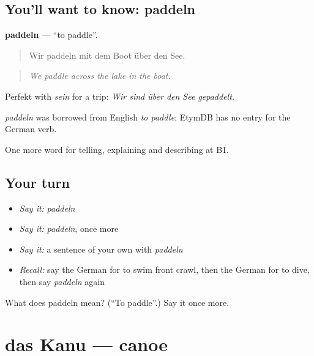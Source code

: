 \subsection*{You'll want to know: paddeln}
\textbf{paddeln} — \textquotedblleft{}to paddle\textquotedblright{}.

\begin{quote}
Wir paddeln mit dem Boot über den See.
\end{quote}

\begin{quote}
\emph{We paddle across the lake in the boat.}
\end{quote}

Perfekt with \emph{sein} for a trip: \emph{Wir sind über den See gepaddelt.}

\begin{cousinweb}
\emph{paddeln} was borrowed from English \emph{to paddle}; EtymDB has no entry for the German verb.
\end{cousinweb}

\begin{grammarlens}[title={What you've built}]
One more word for telling, explaining and describing at B1.
\end{grammarlens}

\subsection*{Your turn}
\begin{itemize}
\raggedright
  \item \emph{Say it:} \emph{paddeln}
  \item \emph{Say it:} \emph{paddeln}, once more
  \item \emph{Say it:} a sentence of your own with \emph{paddeln}
  \item \emph{Recall:} say the German for to swim front crawl, then the German for to dive, then say \emph{paddeln} again
\end{itemize}

\begin{tcolorbox}[breakable,colback=teal!4,colframe=teal!35!black,title={Before you move on}]
What does paddeln mean? (\textquotedblleft{}To paddle\textquotedblright{}.) Say it once more.
\end{tcolorbox}
\section[das Kanu]{das Kanu — canoe}

